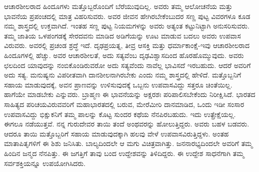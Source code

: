 ಆಚಾರಶೀಲರಾದ ಹಿಂದೂಗಳು ಮತ್ತೊಬ್ಬರೊಂದಿಗೆ ಬೆರೆಯುವುದಿಲ್ಲ. ಅವರು ತಮ್ಮ ಆಲೋಚನೆಯ ಮತ್ತು ಭಾವನೆಯ ಪ್ರಪಂಚದಲ್ಲಿ ಮಾತ್ರ ವಿಹರಿಸುವರು. ಅವರ ಜೀವನ ಹೇಗಿರಬೇಕೆಂಬುದರ ಸಣ್ಣ ಪುಟ್ಟ ವಿವರಗಳೂ ಕೂಡ ನಮ್ಮ ಶಾಸ್ತ್ರದಲ್ಲಿ ಉಕ್ತವಾಗಿದೆ. ಇಂತಹ ಸಣ್ಣ ಪುಟ್ಟ ನಿಯಮಗಳನ್ನು ಅವರು ಅತ್ಯಂತ ಕಟ್ಟುನಿಟ್ಟಾಗಿ ಅನುಸರಿಸುವರು. ತಮ್ಮ ಜಾತಿಯ ಒಳಪಂಗಡಕ್ಕೆ ಸೇರದವನು ಮಾಡಿದ ಅಡಿಗೆಯನ್ನು ಊಟ ಮಾಡುವ ಬದಲು ಅವರು ಉಪವಾಸ ವಿರುವರು. ಅವರಲ್ಲಿ ಪ್ರಚಂಡ ಶ್ರದ್ಧೆ ಇದೆ. ದೃಢಪ್ರಯತ್ನ, ತೀವ್ರ ಆಸಕ್ತಿ ಮತ್ತು ಧರ್ಮಾಕಾಂಕ್ಷೆ-ಇವು ಆಚಾರಶೀಲರಾದ ಹಿಂದೂಗಳಲ್ಲಿ ಹೆಚ್ಚು. ಅವರ ಆಚಾರಶೀಲತೆ, ಅದು ಸತ್ಯವೆಂಬ ದೃಢವಿಶ್ವಾಸದಿಂದ ಹೊರಹೊಮ್ಮುವುದು. ಅವರು ಛಲದಿಂದ ಯಾವುದನ್ನು ನಂಬಿಕೊಂಡಿರುವರೋ ಅದು ಸತ್ಯವೆಂದು ನಾವೆಲ್ಲ ಭಾವಿಸದೆ ಇರಬಹುದು. ಆದರೆ ಅವರಿಗೆ ಅದು ಸತ್ಯ. ಮನುಷ್ಯನು ವಿಪರೀತವಾಗಿ ದಾನಶೀಲನಾಗಿರಬೇಕು ಎಂದು ನಮ್ಮ ಶಾಸ್ತ್ರದಲ್ಲಿ ಹೇಳಿದೆ. ಮತ್ತೊಬ್ಬನಿಗೆ ಸಹಾಯ ಮಾಡುವುದಕ್ಕೆ, ಅವನ ಪ್ರಾಣವನ್ನು ಉಳಿಸುವುದಕ್ಕೆ ಒಬ್ಬನು ಉಪವಾಸವಿದ್ದು ಸತ್ತರೂ ಚಿಂತೆಯಿಲ್ಲ. ಹಾಗೆಯೇ ಮಾಡಬೇಕು ಎನ್ನುವರು. ಬ್ರಾಹ್ಮಣ ಈ ಭಾವನೆಯನ್ನು ಅಕ್ಷರಶಃ ಪರಿಪಾಲಿಸಬೇಕೆಂದು ನಿರೀಕ್ಷಿಸಿದೆ. ಭಾರತದ ಸಾಹಿತ್ಯದ ಪರಿಚಯವಿರುವವರಿಗೆ ಮಹಾಭಾರತದಲ್ಲಿ ಬರುವ, ಮೇರೆಮೀರಿ ದಾನಮಾಡಿದ, ಒಂದು ಇಡೀ ಸಂಸಾರ ಉಪವಾಸವಿದ್ದು ಭಿಕ್ಷುಕನಿಗೆ ತಮ್ಮ ಪಾಲನ್ನು ಕೊಟ್ಟ ಸುಂದರ ಕಥೆಯ ನೆನಪಿರಬಹುದು. ಇದು ಉತ್ಪ್ರೇಕ್ಷೆಯಲ್ಲ. ಈಗಲೂ ನಡೆಯುತ್ತವೆ. ನನ್ನ ಗುರುದೇವರ ತಾಯಿ ತಂದೆ ಅಂಥವರನ್ನು ಹೋಲುತ್ತಿದ್ದರು. ಅವರು ಬಹಳ ಬಡವರು. ಆದರೂ ತಾಯಿ ಮತ್ತೊಬ್ಬರಿಗೆ ಸಹಾಯ ಮಾಡುವುದಕ್ಕಾಗಿ ಹಲವು ವೇಳೆ ಉಪವಾಸವಿರುತ್ತಿದ್ದಳು. ಅಂತಹ ಮಾತಾಪಿತೃಗಳಿಗೆ ಈ ಶಿಶು ಜನಿಸಿತು. ಬಾಲ್ಯದಿಂದಲೇ ಆ ಮಗು ವಿಚಿತ್ರವಾಗಿತ್ತು. ಜನನಾರಭ್ಯದಿಂದಲೇ ಅವರಿಗೆ ತಮ್ಮ ಹಿಂದಿನ ಜನ್ಮದ ನೆನಪಿತ್ತು. ಈ ಜಗತ್ತಿಗೆ ತಾವು ಬಂದ ಉದ್ದೇಶವನ್ನು ತಿಳಿದಿದ್ದರು. ಈ ಉದ್ದೇಶ ಸಾಧನೆಗಾಗಿ ತಮ್ಮ ಸರ್ವಶಕ್ತಿಯನ್ನೂ ಉಪಯೋಗಿಸಿದರು.

